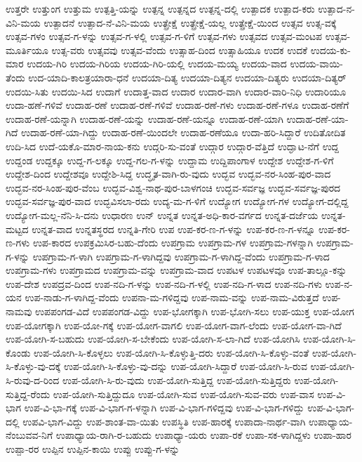 ಉತ್ತರೇ
ಉತ್ತುಂಗ
ಉತ್ತುಮ
ಉತ್ಪತ್ತಿ-ಯನ್ನು
ಉತ್ಪನ್ನ
ಉತ್ಪನ್ನದ
ಉತ್ಪನ್ನ-ದಲ್ಲಿ
ಉತ್ಪಾದಕ
ಉತ್ಪಾದ-ಕರು
ಉತ್ಪಾದ-ನ-ವಿನಿ-ಮಯ
ಉತ್ಪಾದನೆ
ಉತ್ಪಾದ-ನೆ-ವಿನಿ-ಮಯ
ಉತ್ಪ್ರೇಕ್ಷೆ
ಉತ್ಪ್ರೇಕ್ಷೆ-ಯಲ್ಲ
ಉತ್ಪ್ರೇಕ್ಷೆ-ಯಿಂದ
ಉತ್ಸವ
ಉತ್ಸ-ವಕ್ಕೆ
ಉತ್ಸವ-ಗಳಂ
ಉತ್ಸವ-ಗ-ಳನ್ನು
ಉತ್ಸವ-ಗ-ಳಲ್ಲಿ
ಉತ್ಸವ-ಗ-ಳಿಗೆ
ಉತ್ಸವ-ಗಳು
ಉತ್ಸವದ
ಉತ್ಸವ-ಮಂಟಪ
ಉತ್ಸವ-ಮೂರ್ತಿಯೂ
ಉತ್ಸ-ವರು
ಉತ್ಸವವು
ಉತ್ಸವ-ವೆಂದು
ಉತ್ಸಾಹ-ದಿಂದ
ಉತ್ಸಾಹಿಯೂ
ಉದಕ
ಉದಕೆ
ಉದಯ-ಕು-ಮಾರ
ಉದಯ-ಗಿರಿ
ಉದಯ-ಗಿರಿಯ
ಉದಯ-ಗಿರಿ-ಯಲ್ಲಿ
ಉದಯ-ಮಯ್ಯ
ಉದಯ-ವಾದ
ಉದಯ-ವಾಯಿ-ತೆಂದು
ಉದ-ಯಾದಿ-ಕಾಲತ್ರಯಾರಾ-ಧನೆ
ಉದಯಾ-ದಿತ್ಯ
ಉದಯಾ-ದಿತ್ಯನ
ಉದಯಾ-ದಿತ್ಯರು
ಉದಯಾ-ದಿತ್ಯರ್
ಉದಯಿ-ಸಿತು
ಉದಯಿ-ಸಿದ
ಉದಾಗೆ
ಉದಾತ್ತ-ವಾದ
ಉದಾರ
ಉದಾರ-ವಾಗಿ
ಉದಾರ-ವಾರಿ-ನಿಧಿ
ಉದಾರಿಯೂ
ಉದಾ-ಹಣೆ-ಗಳಿವೆ
ಉದಾಹ-ರಣೆ
ಉದಾಹ-ರಣೆ-ಗಳಿವೆ
ಉದಾಹ-ರಣೆ-ಗಳು
ಉದಾಹ-ರಣೆ-ಗಳೂ
ಉದಾಹ-ರಣೆಗೆ
ಉದಾಹ-ರಣೆ-ಯನ್ನಾಗಿ
ಉದಾಹ-ರಣೆ-ಯನ್ನು
ಉದಾಹ-ರಣೆ-ಯನ್ನೂ
ಉದಾಹ-ರಣೆ-ಯಾಗಿ
ಉದಾಹ-ರಣೆ-ಯಾ-ಗಿದೆ
ಉದಾಹ-ರಣೆ-ಯಾ-ಗಿದ್ದು
ಉದಾಹ-ರಣೆ-ಯಿಂದಲೇ
ಉದಾಹ-ರಣೆಯೂ
ಉದಾ-ಹರಿ-ಸಿದ್ದಾರೆ
ಉದಿತೋದಿತ
ಉದಿ-ಸಿದ
ಉದೆ-ಯಕೊ-ಮಾರ-ನಾಯ-ಕನು
ಉದ್ಗರಿ-ಸು-ವಂತೆ
ಉದ್ಗಾರ
ಉದ್ಗಾರ-ವೆತ್ತಿದೆ
ಉದ್ಘಾಟ-ನೆಗೆ
ಉದ್ದ
ಉದ್ದಂಡ
ಉದ್ದಕ್ಕೂ
ಉದ್ದ-ಗ-ಲಕ್ಕೂ
ಉದ್ದ-ಗಲ-ಗ-ಳನ್ನು
ಉದ್ದಾಮ
ಉದ್ದಿಪಾಂಗಾಳ
ಉದ್ದೇಶ
ಉದ್ದೇಶ-ಗ-ಳಿಗೆ
ಉದ್ದೇಶ-ದಿಂದ
ಉದ್ದೇಶವೂ
ಉದ್ದೇಶಿ-ಸಿದ್ದ
ಉದ್ಧೃತ-ವಾಗಿ-ರು-ವುದು
ಉದ್ಭವ
ಉದ್ಭವ-ನರ-ಸಿಂಹ-ಪುರ-ವಾದ
ಉದ್ಭವ-ನರ-ಸಿಂಹ-ಪುರ-ವೆಂಬ
ಉದ್ಭವ-ವಿಶ್ವ-ನಾಥ-ಪುರ-ಬಾಳಗಂಚಿ
ಉದ್ಭವ-ಸರ್ವಜ್ಞ
ಉದ್ಭವ-ಸರ್ವಜ್ಞ-ಪುರದ
ಉದ್ಭವ-ಸರ್ವಜ್ಞ-ಪುರ-ವಾದ
ಉದ್ಭವಿಸಲಾ-ರದು
ಉದ್ಯ-ಮ-ಗ-ಳಿಗೆ
ಉದ್ಯೋಗ
ಉದ್ಯೋಗ-ಗಳ
ಉದ್ಯೋಗ-ದಲ್ಲಿದ್ದ
ಉದ್ಯೋಗ-ಮಲ್ಲ-ನೆನಿ-ಸಿ-ದನು
ಉಧಾರಣ
ಉನ್
ಉನ್ನತ
ಉನ್ನತ-ಅಧಿ-ಕಾರ-ವರ್ಗದ
ಉನ್ನತ-ದರ್ಜೆಯ
ಉನ್ನತ-ಮಟ್ಟದ
ಉನ್ನತ-ವಾದ
ಉನ್ನತಸ್ಥರದ
ಉನ್ನತಿ-ಗೇರಿ
ಉಪ
ಉಪ-ಕರ-ಣ-ಗ-ಳನ್ನು
ಉಪ-ಕರ-ಣ-ಗ-ಳನ್ನೂ
ಉಪ-ಕರ-ಣ-ಗಳು
ಉಪ-ಕಾರದ
ಉಪಕ್ರಮಿಸಿರ-ಬಹು-ದೆಂದು
ಉಪಗ್ರಾಮ
ಉಪಗ್ರಾಮ-ಗಳ
ಉಪಗ್ರಾಮ-ಗಳನ್ನಾಗಿ
ಉಪಗ್ರಾಮ-ಗ-ಳನ್ನು
ಉಪಗ್ರಾಮ-ಗ-ಳಾಗಿ
ಉಪಗ್ರಾಮ-ಗ-ಳಾಗಿದ್ದವು
ಉಪಗ್ರಾಮ-ಗ-ಳಾಗಿದ್ದ-ವೆಂದು
ಉಪಗ್ರಾಮ-ಗ-ಳಾದ
ಉಪಗ್ರಾಮ-ಗಳು
ಉಪಗ್ರಾಮದ
ಉಪಗ್ರಾಮ-ವನ್ನು
ಉಪಗ್ರಾಮ-ವಾದ
ಉಪಟಳ
ಉಪಟಳವೂ
ಉಪ-ತಾಲ್ಲೂ-ಕನ್ನು
ಉಪ-ದೇಶ
ಉಪದ್ರವ-ದಿಂದ
ಉಪ-ನದಿ-ಗ-ಳನ್ನು
ಉಪ-ನದಿ-ಗ-ಳಲ್ಲಿ
ಉಪ-ನದಿ-ಗ-ಳಾದ
ಉಪ-ನದಿ-ಗಳು
ಉಪ-ನ-ಯನ
ಉಪ-ನಾಡು-ಗ-ಳಾಗಿದ್ದ-ವೆಂದು
ಉಪನಾ-ಮ-ಗಳಿದ್ದವು
ಉಪ-ನಾಮ-ವನ್ನು
ಉಪ-ನಾಮ-ವಿರುತ್ತದೆ
ಉಪ-ನಾಮವು
ಉಪಪಂಗಡ-ವಿದೆ
ಉಪಪಂಗಡ-ವಿದ್ದು
ಉಪ-ಭೋಗಕ್ಕಾಗಿ
ಉಪ-ಭೋಗಿ-ಸಲು
ಉಪ-ಯುಕ್ತ
ಉಪ-ಯೋಗ
ಉಪ-ಯೋಗಕ್ಕಾಗಿ
ಉಪ-ಯೋ-ಗಕ್ಕೆ
ಉಪ-ಯೋಗ-ವಾಗಲಿ
ಉಪ-ಯೋಗ-ವಾಗ-ಲೆಂದು
ಉಪ-ಯೋಗ-ವಾ-ಗಿದೆ
ಉಪ-ಯೋಗಿ-ಸ-ಬಹುದು
ಉಪ-ಯೋಗಿ-ಸ-ಬೇಕೆಂದು
ಉಪ-ಯೋಗಿ-ಸ-ಲಾ-ಗಿದೆ
ಉಪ-ಯೋಗಿಸಿ
ಉಪ-ಯೋಗಿ-ಸಿ-ಕೊಂಡು
ಉಪ-ಯೋಗಿ-ಸಿ-ಕೊಳ್ಳಲು
ಉಪ-ಯೋಗಿ-ಸಿ-ಕೊಳ್ಳುತ್ತಿ-ದರು
ಉಪ-ಯೋಗಿ-ಸಿ-ಕೊಳ್ಳು-ವಂತೆ
ಉಪ-ಯೋಗಿ-ಸಿ-ಕೊಳ್ಳು-ವು-ದಕ್ಕೆ
ಉಪ-ಯೋಗಿ-ಸಿ-ಕೊಳ್ಳು-ವು-ದನ್ನು
ಉಪ-ಯೋಗಿ-ಸಿದ್ದಾರೆ
ಉಪ-ಯೋಗಿ-ಸಿ-ರುವ
ಉಪ-ಯೋಗಿ-ಸಿ-ರುವು-ದ-ರಿಂದ
ಉಪ-ಯೋಗಿ-ಸಿ-ರು-ವುದು
ಉಪ-ಯೋಗಿ-ಸುತ್ತಿದ್ದ
ಉಪ-ಯೋಗಿ-ಸುತ್ತಿದ್ದರು
ಉಪ-ಯೋಗಿ-ಸುತ್ತಿದ್ದ-ರೆಂದು
ಉಪ-ಯೋಗಿ-ಸುತ್ತಿದ್ದುದೂ
ಉಪ-ಯೋಗಿ-ಸುವ
ಉಪ-ಯೋಗಿ-ಸುವ-ವರು
ಉಪ-ವಾಸ
ಉಪ-ವಿ-ಭಾಗ
ಉಪ-ವಿ-ಭಾ-ಗಕ್ಕೆ
ಉಪ-ವಿ-ಭಾಗ-ಗ-ಳನ್ನಾಗಿ
ಉಪ-ವಿ-ಭಾಗ-ಗಳಿದ್ದವು
ಉಪ-ವಿ-ಭಾಗ-ಗಳಿದ್ದು
ಉಪ-ವಿ-ಭಾಗ-ದಲ್ಲಿ
ಉಪವಿ-ಭಾಗ-ವಿದ್ದು
ಉಪ-ಶಾಂತ-ವಾ-ಯಿತು
ಉಪಸ್ಥಿತಿ
ಉಪ-ಹಾರಕ್ಕೆ
ಉಪಾದಾ-ನಾರ್ಥ-ವಾಗಿ
ಉಪಾಧ್ಯಾಯ-ನೆಂಬುವವ-ನಿಗೆ
ಉಪಾಧ್ಯಾಯ-ರಾಗಿ-ರ-ಬಹುದು
ಉಪಾಧ್ಯಾ-ಯರು
ಉಪಾ-ರಕೆ
ಉಪಾ-ಸಕ-ಳಾಗಿದ್ದಳು
ಉಪಾ-ಹಾರ
ಉಪ್ಪಾ-ರರ
ಉಪ್ಪಿನ
ಉಪ್ಪಿನ-ಕಾಯಿ
ಉಪ್ಪು
ಉಪ್ಪು-ಗ-ಳನ್ನು
